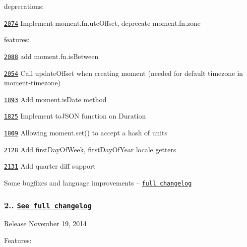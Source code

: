 deprecations\+:
\begin{DoxyItemize}
\item \href{https://github.com/moment/moment/issues/2074}{\tt 2074} Implement {\ttfamily moment.\+fn.\+utc\+Offset}, deprecate {\ttfamily moment.\+fn.\+zone}
\end{DoxyItemize}

features\+:
\begin{DoxyItemize}
\item \href{https://github.com/moment/moment/issues/2088}{\tt 2088} add moment.\+fn.\+is\+Between
\item \href{https://github.com/moment/moment/issues/2054}{\tt 2054} Call update\+Offset when creating moment (needed for default timezone in moment-\/timezone)
\item \href{https://github.com/moment/moment/issues/1893}{\tt 1893} Add moment.\+is\+Date method
\item \href{https://github.com/moment/moment/issues/1825}{\tt 1825} Implement to\+J\+S\+ON function on Duration
\item \href{https://github.com/moment/moment/issues/1809}{\tt 1809} Allowing moment.\+set() to accept a hash of units
\item \href{https://github.com/moment/moment/issues/2128}{\tt 2128} Add first\+Day\+Of\+Week, first\+Day\+Of\+Year locale getters
\item \href{https://github.com/moment/moment/issues/2131}{\tt 2131} Add quarter diff support
\end{DoxyItemize}

Some bugfixes and language improvements -- \href{https://gist.github.com/ichernev/0c9a9b49951111a27ce7}{\tt full changelog}

\subsubsection*{2.. \href{https://gist.github.com/ichernev/a4fcb0a46d74e4b9b996}{\tt See full changelog}}


\begin{DoxyItemize}
\item Release November 19, 2014
\end{DoxyItemize}

Features\+:


